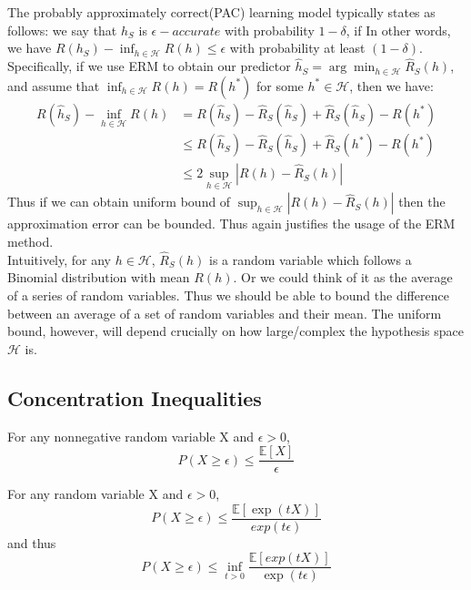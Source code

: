 \noindent The probably approximately correct(PAC) learning model typically states as follows: we say that $\hat{h}_S$ is $\epsilon-accurate$ with probability $1-\delta$, if
In other words, we have $R(h_S)-\inf_{h \in \mathcal{H}} R(h) \leq \epsilon$ with probability at least $(1-\delta)$.\\

Specifically, if we use ERM to obtain our predictor $\hat{h}_S = \arg\min_{h \in \mathcal{H}} \hat{R}_S(h)$, and assume that $\inf_{h \in \mathcal{H}} R(h) = R(h^*)$ for some $h^* \in \mathcal{H}$, then we have:
\begin{align}
R(\hat{h}_S)-\inf_{h \in \mathcal{H}}R(h) &= R(\hat{h}_S)-\hat{R}_S(\hat{h}_S)+\hat{R}_S (\hat{h}_S)-R(h^*) \\
&\leq R(\hat{h}_S)-\hat{R}_S (\hat{h}_S)+\hat{R}_S (h^*)-R(h^*) \\
&\leq 2\sup_{h \in \mathcal{H}} |R(h)-\hat{R}_S (h)|	
\end{align}
Thus if we can obtain uniform bound of $\sup_{h \in \mathcal{H}} |R(h)-\hat{R}_S (h)|$ then the approximation error can be bounded.
Thus again justifies the usage of the ERM method.\\
Intuitively, for any $h \in \mathcal{H}$, $\hat{R}_S(h)$ is a random variable which follows a Binomial distribution with mean $R(h)$. Or we could think of it as the average of a series of random variables. Thus we should be
able to bound the difference between an average of a set of random variables and their mean. The uniform bound, however, will depend crucially on how large/complex the hypothesis space $\mathcal{H}$ is.\\

\subsection{Concentration Inequalities}
\begin{theorem}
	For any nonnegative random variable X and $\epsilon > 0$,
	$$P(X \geq \epsilon) \leq \frac{\mathbb{E}[X]}{\epsilon}$$
\end{theorem}


\begin{theorem}
	For any random variable X and $\epsilon > 0$,
	$$P(X \geq \epsilon) \leq \frac{\mathbb{E}[\exp(tX)]}{exp(t\epsilon)}$$
	and thus
	$$P(X \geq \epsilon) \leq \inf_{t > 0} \frac{\mathbb{E}[exp(tX)]}{\exp(t\epsilon)}$$
\end{theorem}


